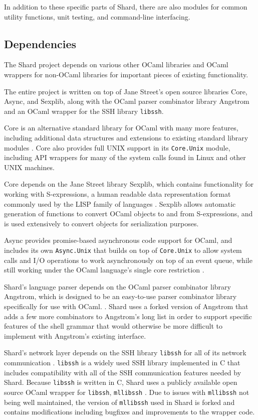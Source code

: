 \documentclass[oneside]{report}
\newcommand{\todoi}[1]{\todo[inline, color=blue!20]{TODO: {#1}}}
\begin{document}

In addition to these specific parts of Shard, there are also modules for common utility functions, unit testing, and command-line interfacing.

\subsection{Dependencies}
The Shard project depends on various other OCaml libraries and OCaml wrappers for non-OCaml libraries for important pieces of existing functionality.

The entire project is written on top of Jane Street's open source libraries Core, Async, and Sexplib, along with the OCaml parser combinator library Angstrom and an OCaml wrapper for the SSH library \texttt{libssh}.

Core is an alternative standard library for OCaml with many more features, including additional data structures and extensions to existing standard library modules \cite{ocamlcore}.
Core also provides full UNIX support in its \texttt{Core.Unix} module, including API wrappers for many of the system calls found in Linux and other UNIX machines.

Core depends on the Jane Street library Sexplib, which contains functionality for working with S-expressions, a human readable data representation format commonly used by the LISP family of languages \cite{mccarthy1960recursive}. Sexplib allows automatic generation of functions to convert OCaml objects to and from S-expressions, and is used extensively to convert objects for serialization purposes.

Async provides promise-based asynchronous code support for OCaml, and includes its own \texttt{Async.Unix} that builds on top of \texttt{Core.Unix} to allow system calls and I/O operations to work asynchronously on top of an event queue, while still working under the OCaml language's single core restriction \cite{ocamlasync}.

Shard's language parser depends on the OCaml parser combinator library Angstrom, which is designed to be an easy-to-use parser combinator library specifically for use with OCaml. \cite{ocamlangstrom}.
Shard uses a forked version of Angstrom that adds a few more combinators to Angstrom's long list in order to support specific features of the shell grammar that would otherwise be more difficult to implement with Angstrom's existing interface.

Shard's network layer depends on the SSH library \texttt{libssh} for all of its network communication \cite{libssh}.
\texttt{libssh} is a widely used SSH library implemented in C that includes compatibility with all of the SSH communication features needed by Shard.
Because \texttt{libssh} is written in C, Shard uses a publicly available open source OCaml wrapper for \texttt{libssh}, \texttt{mllibssh} \cite{mllibssh}.
Due to issues with \texttt{mllibssh} not being well maintained, the version of \texttt{mllibssh} used in Shard is forked and contains modifications including bugfixes and improvements to the wrapper code.
\end{document}
